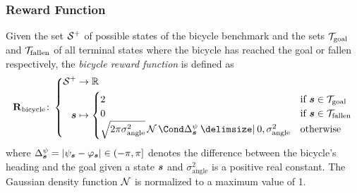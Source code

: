 \begin{frame}
    \frametitle{Reward Function}

    \begin{definition}
        Given the set $\mathcal{S}^+$ of possible states of the bicycle benchmark and the sets $\mathcal{T}_{\text{goal}}$ and $\mathcal{T}_{\text{fallen}}$ of all terminal states where the bicycle has reached the goal or fallen respectively, the \emph{bicycle reward function} is defined as
        \begin{align}
            \RwdBicycle \colon \left\{
                \begin{aligned}
                    \Es^+ &\to \R \\
                    \mat{s} &\mapsto \begin{cases}
                    2 & \text{if $\mat{s} \in \Goal$} \\
                    0 & \text{if $\mat{s} \in \Fallen$} \\
                    \sqrt{2\pi\sigma_{\text{angle}}^2}\Gaussian{\Delta^\psi_{\mat{s}} \given 0, \sigma_{\text{angle}}^2} & \text{otherwise}
                \end{cases}
            \end{aligned}
            \right.
        \end{align}
    where $\Delta^\psi_{\bm{s}} = \vert\psi_{\bm{s}} - \varphi_{\bm{s}}\vert \in (-\pi, \pi]$ denotes the difference between the bicycle's heading and the goal given a state $\bm{s}$ and $\sigma_{\text{angle}}^2$ is a positive real constant.
    The Gaussian density function $\operatorname{\mathcal{N}}$ is normalized to a maximum value of 1.
    \end{definition}
\end{frame}

